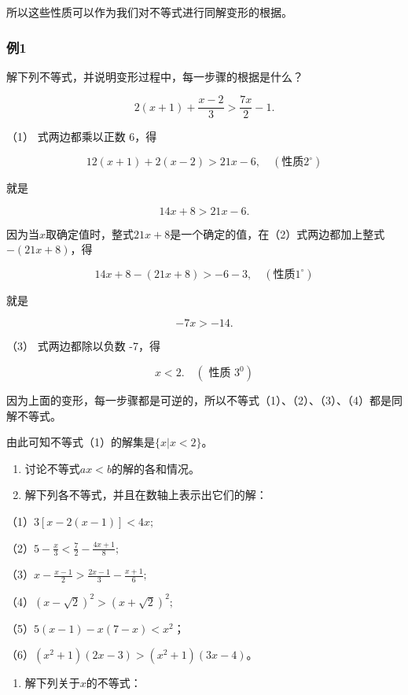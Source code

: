 所以这些性质可以作为我们对不等式进行同解变形的根据。

\subsubsection{例1}

解下列不等式，并说明变形过程中，每一步骤的根据是什么？

\[
2 (x + 1) + \frac{x - 2}{3} > \frac{7 x}{2} - 1. \tag {1}
\]

 （1） 式两边都乘以正数 6，得

\[
12 (x + 1) + 2 (x - 2) > 21 x - 6, \quad (\text{性质} 2^{\circ})
\]

就是

\[
14 x + 8 > 21 x - 6. \tag {2}
\]

因为当\(x\)取确定值时，整式\(21x + 8\)是一个确定的值，在（2）式两边都加上整式\(-(21x + 8)\)，得

\[
14 x + 8 - (21 x + 8) > - 6 - 3, \quad (\text{性质} 1^{\circ})
\]

就是

\[
- 7 x > - 14. \tag {3}
\]

（3） 式两边都除以负数 -7，得

\[
x < 2. \quad (\text{ 性质 } 3^{0}) \tag {4}
\]

因为上面的变形，每一步骤都是可逆的，所以不等式（1）、（2）、（3）、（4）都是同解不等式。

由此可知不等式（1）的解集是\(\{x|x < 2\}\)。

\begin{enumerate}
\item
  讨论不等式\(ax < b\)的解的各和情况。
\item
  解下列各不等式，并且在数轴上表示出它们的解：
\end{enumerate}

（1）\(3[x - 2(x - 1)] < 4x;\)

（2）\(5 - \frac{x}{3} < \frac{7}{2} - \frac{4x + 1}{8};\)

（3）\(x - \frac{x - 1}{2} >\frac{2x - 1}{3} -\frac{x + 1}{6};\)

（4）\((x - \sqrt{2})^2 > (x + \sqrt{2})^2;\)

（5）\(5(x - 1) - x(7 - x) < x^2\)；

（6）\((x^{2} + 1)(2x - 3) > (x^{2} + 1)(3x - 4)\)。

\begin{enumerate}[start=3]
\item
  解下列关于\(x\)的不等式：
\end{enumerate}

